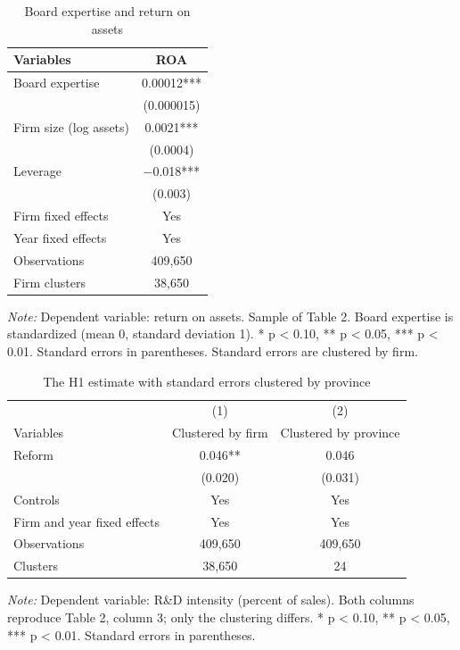 \documentclass[12pt]{article}
\newcommand{\tabnote}[1]{\par\vspace{2pt}\begin{minipage}{\linewidth}\footnotesize\setstretch{1.0}\textit{Note:} #1\end{minipage}}
\begin{document}
\begin{table}[!htbp]
\centering
\begin{threeparttable}
\caption{Board expertise and return on assets}
\small
{}
\begin{tabular}{lc}
\toprule
Variables & ROA \\
\midrule
Board expertise & 0.00012*** \\
 & (0.000015) \\
Firm size (log assets) & 0.0021*** \\
 & (0.0004) \\
Leverage & $-$0.018*** \\
 & (0.003) \\
\midrule
Firm fixed effects & Yes \\
Year fixed effects & Yes \\
Observations & 409,650 \\
Firm clusters & 38,650 \\
\bottomrule
\end{tabular}
\tabnote{Dependent variable: return on assets. Sample of Table 2. Board expertise is standardized (mean 0, standard deviation 1). * p < 0.10, ** p < 0.05, *** p < 0.01. Standard errors in parentheses. Standard errors are clustered by firm.}
\end{threeparttable}
\end{table}

\begin{table}[!htbp]
\centering
\begin{threeparttable}
\caption{The H1 estimate with standard errors clustered by province}
\small
{}
\begin{tabular}{lcc}
\toprule
 & (1) & (2) \\
Variables & Clustered by firm & Clustered by province \\
\midrule
Reform & 0.046** & 0.046 \\
 & (0.020) & (0.031) \\
\midrule
Controls & Yes & Yes \\
Firm and year fixed effects & Yes & Yes \\
Observations & 409,650 & 409,650 \\
Clusters & 38,650 & 24 \\
\bottomrule
\end{tabular}
\tabnote{Dependent variable: R\&D intensity (percent of sales). Both columns reproduce Table 2, column 3; only the clustering differs. * p < 0.10, ** p < 0.05, *** p < 0.01. Standard errors in parentheses.}
\end{threeparttable}
\end{table}
\end{document}

